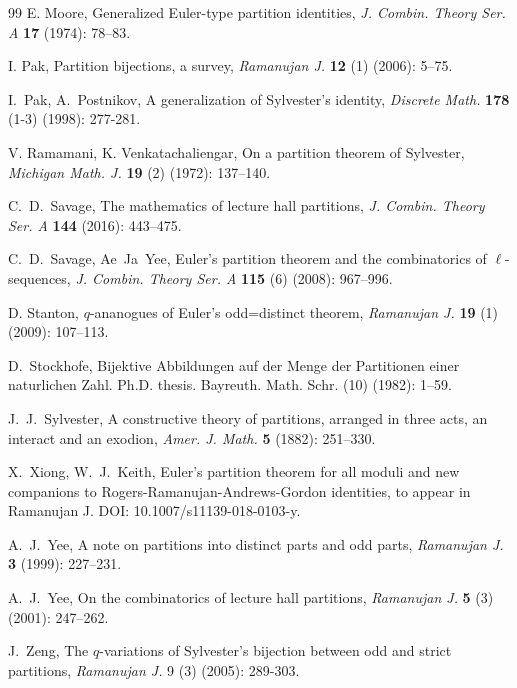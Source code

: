 \documentclass[11pt,reqno]{amsart}
\numberwithin{equation}{section}
\theoremstyle{plain}
\theoremstyle{definition}
\begin{document}
\begin{thebibliography}{99}
 E. Moore, Generalized Euler-type partition identities, \textit{J. Combin. Theory Ser. A} \textbf{17} (1974): 78--83.

 I. Pak, Partition bijections, a survey, \textit{Ramanujan J.} \textbf{12} (1) (2006): 5--75.

 I.~Pak, A.~Postnikov, A generalization of Sylvester's identity, \textit{Discrete Math.} \textbf{178} (1-3) (1998): 277-281.

 V. Ramamani, K. Venkatachaliengar, On a partition theorem of Sylvester, \textit{Michigan Math. J.} \textbf{19} (2) (1972): 137--140.

 C.~D.~Savage, The mathematics of lecture hall partitions, \textit{J. Combin. Theory Ser. A} \textbf{144} (2016): 443--475.

 C.~D.~Savage, Ae~Ja~Yee, Euler's partition theorem and the combinatorics of $\ell$-sequences, \textit{J. Combin. Theory Ser. A} \textbf{115} (6) (2008): 967--996.

 D. Stanton, $q$-ananogues of Euler's odd=distinct theorem, \textit{Ramanujan J.} \textbf{19} (1) (2009): 107--113.

 D.~Stockhofe, Bijektive Abbildungen auf der Menge der Partitionen einer naturlichen Zahl. Ph.D. thesis. Bayreuth. Math. Schr. (10) (1982): 1--59.

 J.~J.~Sylvester, A constructive theory of partitions, arranged in three acts, an interact and an exodion, \textit{Amer. J. Math.} \textbf{5} (1882):
    251--330.

  X.~Xiong, W.~J.~Keith, Euler's partition theorem for all moduli and new companions to Rogers-Ramanujan-Andrews-Gordon identities, to appear in Ramanujan J. DOI: 10.1007/s11139-018-0103-y.

 A.~J.~Yee, A note on partitions into distinct parts and odd parts, \textit{Ramanujan J.} \textbf{3} (1999): 227--231.

 A.~J.~Yee, On the combinatorics of lecture hall partitions, \textit{Ramanujan J.} \textbf{5} (3) (2001): 247--262.

J.~Zeng, The $q$-variations of Sylvester's bijection between odd and strict partitions, \textit{Ramanujan J.} 9 (3) (2005): 289-303.

\end{thebibliography}
\end{document}
